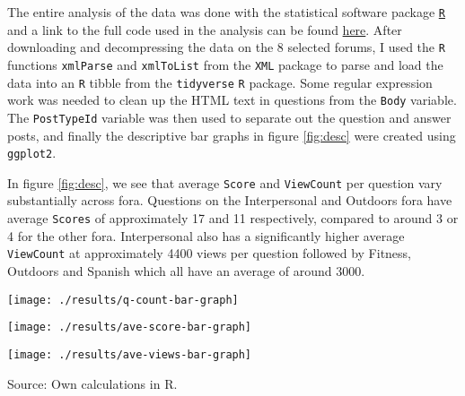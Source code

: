 \documentclass[12pt,preprint, authoryear]{article}
\let\origfigure\figure
\let\endorigfigure\endfigure
\renewenvironment{figure}[1][2] {
    \expandafter\origfigure\expandafter[H]
} {
    \endorigfigure
}
\numberwithin{equation}{section}
\numberwithin{figure}{section}
\numberwithin{table}{section}
\begin{document}
The entire analysis of the data was done with the statistical software
package \href{https://cran.r-project.org}{\texttt{R}} and a link to the
full code used in the analysis can be found
\href{https://github.com/BCallumCarr/msc-lse-thesis/tree/master/01-r-code}{here}.
After downloading and decompressing the data on the 8 selected forums, I
used the \texttt{R} functions \texttt{xmlParse} and \texttt{xmlToList}
from the \texttt{XML} package to parse and load the data into an
\texttt{R} tibble from the \texttt{tidyverse} \texttt{R} package. Some
regular expression work was needed to clean up the HTML text in
questions from the \texttt{Body} variable. The \texttt{PostTypeId}
variable was then used to separate out the question and answer posts,
and finally the descriptive bar graphs in figure \ref{fig:desc} were
created using \texttt{ggplot2}.

In figure \ref{fig:desc}, we see that average \texttt{Score} and
\texttt{ViewCount} per question vary substantially across fora.
Questions on the Interpersonal and Outdoors fora have average
\texttt{Scores} of approximately 17 and 11 respectively, compared to
around 3 or 4 for the other fora. Interpersonal also has a significantly
higher average \texttt{ViewCount} at approximately 4400 views per
question followed by Fitness, Outdoors and Spanish which all have an
average of around 3000.

\renewcommand{\thefigure}{\arabic{figure}}

\footnotesize

\begin{figure}
\caption{\textbf{Fora Descriptive Statistics}}
\label{fig:desc}

\begin{center}\texttt{[image: ./results/q-count-bar-graph]} \end{center}



\begin{center}\texttt{[image: ./results/ave-score-bar-graph]} \end{center}



\begin{center}\texttt{[image: ./results/ave-views-bar-graph]} \end{center}
\centering
{\footnotesize Source: Own calculations in R.}
\end{figure}

\normalsize
\end{document}
